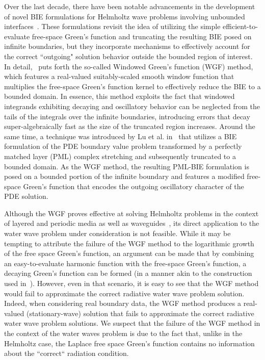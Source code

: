 \documentclass[review,hidelinks,onefignum,onetabnum]{siamart220329}
\begin{document}
Over the last decade, there have been notable advancements in the development of novel BIE formulations for Helmholtz wave problems involving unbounded interfaces~\cite{bruno2016windowed,lu2018perfectly}. These formulations revisit the idea of utilizing the simple efficient-to-evaluate free-space Green's function and truncating the resulting BIE posed on infinite boundaries, but they incorporate mechanisms to effectively account for the correct ``outgoing" solution behavior outside the bounded region of interest. In detail,~\cite{bruno2016windowed} puts forth the so-called Windowed Green's function (WGF) method, which features a real-valued suitably-scaled smooth window function that multiplies the free-space Green's function kernel to effectively reduce the BIE to a bounded domain. In essence, this method exploits the fact that windowed integrands exhibiting decaying and oscillatory behavior can be neglected from the tails of the integrals over the infinite boundaries, introducing errors that decay super-algebraically fast as the size of the truncated region increases. Around the same time, a technique was introduced by Lu et al. in~\cite{lu2018perfectly} that utilizes a BIE formulation of the PDE boundary value problem transformed by a perfectly matched layer (PML) complex stretching and subsequently truncated to a bounded domain. As the WGF method, the resulting PML-BIE formulation is posed on a bounded portion of the infinite boundary and features a modified free-space Green's function that encodes the outgoing oscillatory character of the PDE solution. 

Although the WGF proves effective at solving Helmholtz problems in the context of layered and periodic media as well as waveguides~\cite{bruno2016windowed,bruno2017windowed2,bruno2017windowed,strauszer2023windowed}, its direct application to the water wave problem under consideration is not feasible. While it may be tempting to attribute the failure of the WGF method to the logarithmic growth of the free space Green's function, an argument can be made that by combining an easy-to-evaluate harmonic function with the free-space Green's function, a decaying Green's function can be formed (in a manner akin to the construction used in~\cite{chandler1998uniqueness}). However, even in that scenario, it is easy to see that the WGF method would fail to approximate the correct radiative water wave problem solution.  Indeed, when considering real boundary data, the WGF method produces a real-valued (stationary-wave) solution that fails to approximate the correct radiative water wave problem solutions. We suspect that the failure of the WGF method in the context of the water waves problem is due to the fact that, unlike in the Helmholtz case, the Laplace free space Green's function contains no information about the ``correct`` radiation condition.
\end{document}
